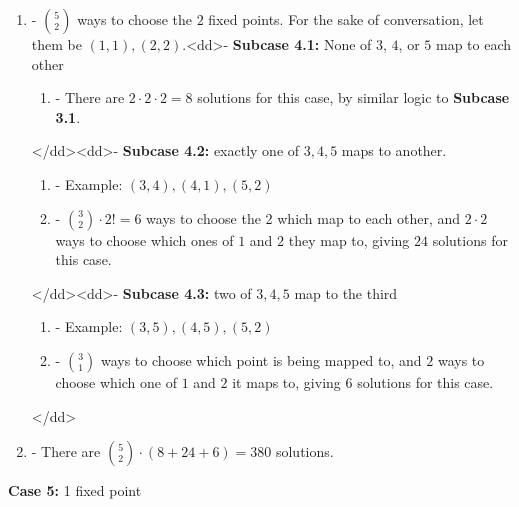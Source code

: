 \begin{enumerate}
 
            \begin{enumerate}[label=(\roman*)]
                \item - $\binom 52$ ways to choose the $2$ fixed points.  For the sake of conversation, let them be $(1, 1), (2, 2)$.<dd>- \textbf{Subcase 4.1:} None of $3$, $4$, or $5$ map to each other
            \begin{enumerate}[label=(\roman*)]
                \item - There are $2 \cdot 2 \cdot 2 = 8$ solutions for this case, by similar logic to \textbf{Subcase 3.1}.
            \end{enumerate}
            </dd><dd>- \textbf{Subcase 4.2:} exactly one of $3, 4, 5$ maps to another.
            \begin{enumerate}[label=(\roman*)]
                \item - Example: $(3, 4), (4, 1), (5, 2)$\item - $\binom 32 \cdot 2! = 6$ ways to choose the 2 which map to each other, and $2\cdot 2$ ways to choose which ones of $1$ and $2$ they map to, giving $24$ solutions for this case.
            \end{enumerate}
            </dd><dd>- \textbf{Subcase 4.3:} two of $3, 4, 5$ map to the third
            \begin{enumerate}[label=(\roman*)]
                \item - Example: $(3, 5), (4, 5), (5, 2)$\item - $\binom 31$ ways to choose which point is being mapped to, and $2$ ways to choose which one of $1$ and $2$ it maps to, giving $6$ solutions for this case.
            \end{enumerate}
            </dd>\item - There are $\binom 52 \cdot (8+24+6) = 380$ solutions.
            \end{enumerate}
            \textbf{Case 5:} 1 fixed point


\end{enumerate}

